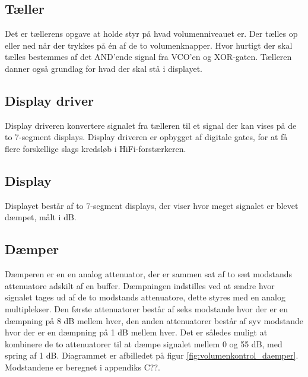 \subsection*{Tæller}
\label{volumenkontrol-simulering-taeller}

Det er tællerens opgave at holde styr på hvad volumenniveauet er. Der tælles op eller ned når der trykkes på én af de to volumenknapper. Hvor hurtigt der skal tælles bestemmes af det AND'ende signal fra VCO'en og XOR-gaten. Tælleren danner også grundlag for hvad der skal stå i displayet.

\subsection*{Display driver}
\label{volumenkontrol-simulering-display_driver}

Display driveren konvertere signalet fra tælleren til et signal der kan vises på de to 7-segment displays. Display driveren er opbygget af digitale gates, for at få flere forskellige slags kredsløb i HiFi-forstærkeren.

\subsection*{Display}
\label{volumenkontrol-simulering-display}

Displayet består af to 7-segment displays, der viser hvor meget signalet er blevet dæmpet, målt i dB.

\subsection*{Dæmper}
\label{volumenkontrol-simulering-daemper}

Dæmperen er en en analog attenuator, der er sammen sat af to sæt modstands attenuatore adskilt af en buffer. Dæmpningen indstilles ved at ændre hvor signalet tages ud af de to modstands attenuatore, dette styres med en analog multiplekser. Den første attenuatorer består af seks modstande hvor der er en dæmpning på 8 dB mellem hver, den anden attenuatorer består af syv modstande hvor der er en dæmpning på 1 dB mellem hver. Det er således muligt at kombinere de to attenuatorer til at dæmpe signalet mellem 0 og 55 dB, med spring af 1 dB. Diagrammet er afbilledet på figur \ref{fig:volumenkontrol_daemper}. Modstandene er beregnet i appendiks C??.

